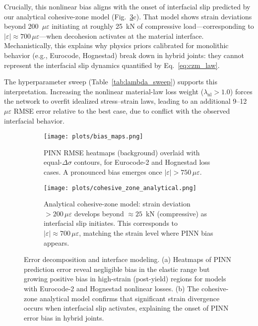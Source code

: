 \documentclass{article}
\begin{document}
Crucially, this nonlinear bias aligns with the onset of interfacial slip predicted by our analytical cohesive-zone model (Fig.~\ref{fig:bias_maps}c). That model shows strain deviations beyond 200~$\mu\varepsilon$ initiating at roughly 25~kN of compressive load—corresponding to $|\varepsilon| \approx 700\,\mu\varepsilon$—when decohesion activates at the material interface. Mechanistically, this explains why physics priors calibrated for monolithic behavior (e.g., Eurocode, Hognestad) break down in hybrid joints: they cannot represent the interfacial slip dynamics quantified by Eq.~\ref{eq:czm_law}.

The hyperparameter sweep (Table~\ref{tab:lambda_sweep}) supports this interpretation. Increasing the nonlinear material-law loss weight ($\lambda_{\text{nl}} > 1.0$) forces the network to overfit idealized stress–strain laws, leading to an additional 9–12~$\mu\varepsilon$ RMSE error relative to the best case, due to conflict with the observed interfacial behavior.

\begin{figure}[H]
\centering
\begin{subfigure}[b]{0.9\textwidth}
    \centering
    \texttt{[image: plots/bias\_maps.png]}
    \caption{PINN RMSE heatmaps (background) overlaid with equal-$\Delta\sigma$ contours, for Eurocode-2 and Hognestad loss cases. A pronounced bias emerges once $|\varepsilon| > 750\,\mu\varepsilon$.}
    \label{fig:pinn_bias_heatmaps}
\end{subfigure}

\vspace{1em}

\begin{subfigure}[b]{0.6\textwidth}
    \centering
    \texttt{[image: plots/cohesive\_zone\_analytical.png]}
    \caption{Analytical cohesive-zone model: strain deviation $>200\,\mu\varepsilon$ develops beyond $\approx\!25$~kN (compressive) as interfacial slip initiates. This corresponds to $|\varepsilon| \approx 700\,\mu\varepsilon$, matching the strain level where PINN bias appears.}
    \label{fig:cz_model}
\end{subfigure}
\caption{Error decomposition and interface modeling. (a) Heatmaps of PINN prediction error reveal negligible bias in the elastic range but growing positive bias in high-strain (post-yield) regions for models with Eurocode-2 and Hognestad nonlinear losses. (b) The cohesive-zone analytical model confirms that significant strain divergence occurs when interfacial slip activates, explaining the onset of PINN error bias in hybrid joints.}
\label{fig:bias_maps}
\end{figure}
\end{document}
